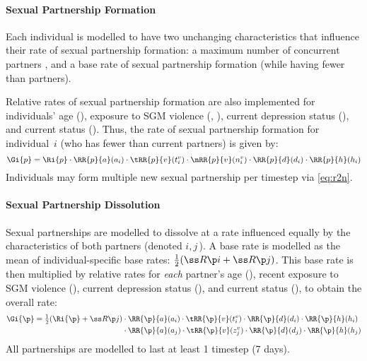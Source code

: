 \paragraph{Sexual Partnership Formation}
Each individual is modelled to have two unchanging characteristics
that influence their rate of sexual partnership formation:
a maximum number of concurrent partners , and
a base rate of sexual partnership formation 
(while having fewer than  partners).
\par
Relative rates of sexual partnership formation are also implemented for
individuals' age (),
exposure to SGM violence (, ),
current depression status (), and
current \hazdrink status ().
Thus, the rate of sexual partnership formation for individual~$i$
(who has fewer than  current partners) is given by:
\begin{equation}
  \Gi{p} = \Ri{p}
    \cdot \RR{p}{a}(a_i)
    \cdot \tRR{p}{v}(t^v_i)
    \cdot \nRR{p}{v}(n^v_i)
    \cdot \RR{p}{d}(d_i)
    \cdot \RR{p}{h}(h_i)
\end{equation}
Individuals may form multiple new sexual partnership per timestep via \eqref{eq:r2n}.
\paragraph{Sexual Partnership Dissolution}
Sexual partnerships are modelled to dissolve at a rate
influenced equally by the characteristics of both partners (denoted $i,j$\,).
A base rate is modelled as the mean of individual-specific base rates:
$\frac12(\ss R\p i + \ss R\p j)$.
This base rate is then multiplied by relative rates for \emph{each} partner's
age (),
recent exposure to SGM violence (),
current depression status (), and
current \hazdrink status (),
to obtain the overall rate:
\begin{align}
  \Gi{\p} = \textstyle\frac12 (\Ri{\p} + \ss R\p j)
   &\cdot \RR{\p}{a}(a_i)
    \cdot \tRR{\p}{v}(t^v_i)
    \cdot \RR{\p}{d}(d_i)
    \cdot \RR{\p}{h}(h_i)
    \nonumber \\
   &\cdot \RR{\p}{a}(a_j)
    \cdot \tRR{\p}{v}(z^v_j)
    \cdot \RR{\p}{d}(d_j)
    \cdot \RR{\p}{h}(h_j)
\end{align}
All partnerships are modelled to last at least 1 timestep (7 days).
